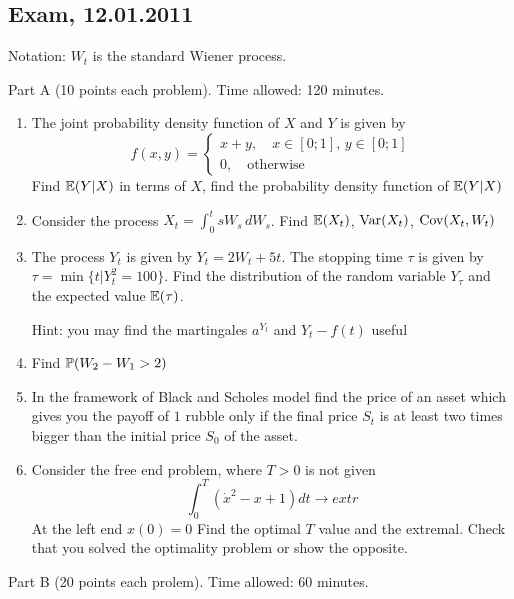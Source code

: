 \documentclass[pdftex,12pt,a4paper]{article}
\begin{document}
\subsection{Exam, 12.01.2011}

Notation: $W_t$ is the standard Wiener process. 


Part A (10 points each problem). Time allowed: 120 minutes.  


\begin{enumerate}
\item The joint probability density function of $X$ and $Y$ is given by
\begin{equation}
f(x,y)=\begin{cases}
x+y, \quad x\in[0;1],\, y\in [0;1] \\
0, \quad \mbox{otherwise}
\end{cases} \nonumber
\end{equation}
Find $\E(Y|X)$ in terms of $X$, find the probability density function of  $\E(Y|X)$
\item Consider the process $X_t=\int_0^t sW_s\,dW_s$. Find $\E(X_t)$, $\Var(X_t)$, $\Cov(X_t,W_t)$
\item The process $Y_t$ is given by $Y_t=2W_t+5t$. The stopping time $\tau$ is given by $\tau=\min\{t|Y_t^2=100\}$. Find the distribution of the random variable $Y_\tau$ and the expected value $\E(\tau)$.


Hint: you may find the martingales $a^{Y_t}$ and $Y_t-f(t)$ useful
\item Find $\P(W_2-W_1>2)$
\item In the framework of Black and Scholes model find the price of an asset which gives you the payoff of $1$ rubble only if the final price $S_t$ is at least two times bigger than the initial price $S_0$ of the asset. 
\item Consider the free end problem, where $T>0$ is not given
\begin{equation}
\int_0^T (\dot{x}^2-x+1)dt \to extr \nonumber
\end{equation}
At the left end $x(0)=0$
Find the optimal $T$ value and the extremal. Check that you solved the optimality problem or show the opposite.
\end{enumerate}

Part B (20 points each prolem). Time allowed: 60 minutes.  
\end{document}
